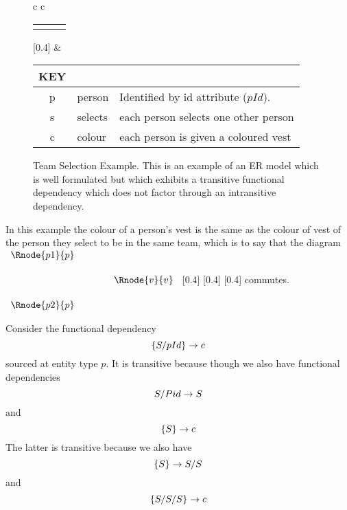 \begin{figure} [h]
\begin{center}
\begin{tabular}{c c}
\begin{tabular}{c p{1.5cm} c}
   \Rnode{p}{p} & & \Rnode{v}{v}
\end{tabular}
[0.4]
\idcomp
& \footnotesize
\begin{tabular}{c p{1.5cm} p{4cm}}
KEY && \\
\hline
p & person & Identified by id attribute ($pId$). \\
s & selects & each person selects one other person \\
c & colour & each person is given a coloured vest 
\end{tabular} 
\end{tabular}
\end{center}
\caption{Team Selection Example. This is an example of an ER model 
which is well formulated but which exhibits a transitive functional dependency which does not factor through an intransitive dependency.
}
\label{teamselectionexample}
\end{figure}

In this example the colour of a person's vest is the same as the 
colour of vest of the person they select to be in the same team, which is to say that  the diagram
$
\begin{array}{c p{0.75cm} c}
   \Rnode{p1}{p}  & &                  \\[0.5cm]
	                 & &    \Rnode{v}{v} \\[0.5cm]
   \Rnode{p2}{p}  & &
			
\end{array}
$
[0.4]
[0.4]
[0.4]
commutes. 


Consider the functional dependency
\begin{equation*}
\left\{S/pId\right\} \rightarrow c
\end{equation*}
sourced at entity type $p$. It is transitive
because though we also have functional dependencies
\begin{equation*}
S/Pid \rightarrow S 
\end{equation*}
and
\begin{equation*}
\left\{S\right\} \rightarrow c
\end{equation*}
The latter is transitive because we also have
\begin{equation*}
\left\{S\right\} \rightarrow S/S
\end{equation*}
and
\begin{equation*}
\left\{S/S/S\right\} \rightarrow c 
\end{equation*} 

